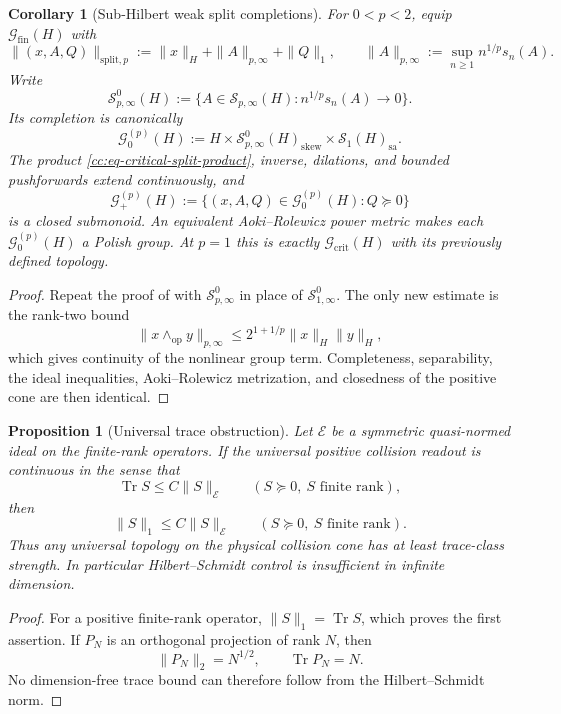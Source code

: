 \documentclass[10pt,reqno]{amsart}
\theoremstyle{plain}
\newtheorem{proposition}[theorem]{Proposition}
\newtheorem{corollary}[theorem]{Corollary}
\theoremstyle{definition}
\theoremstyle{remark}
\begin{document}
\begin{corollary}[Sub-Hilbert weak split completions]
\label{cc:cor-sub-Hilbert-split-completions}
For \(0<p<2\), equip \(\mathscr G_{\mathrm{fin}}(H)\) with
\[
 \|(x,A,Q)\|_{\mathrm{split},p}
 :=\|x\|_H+\|A\|_{p,\infty}+\|Q\|_1,
 \qquad
 \|A\|_{p,\infty}:=\sup_{n\geq1}n^{1/p}s_n(A).
\]
Write
\[
 \mathcal S^0_{p,\infty}(H)
 :=\{A\in\mathcal S_{p,\infty}(H):n^{1/p}s_n(A)\to0\}.
\]
Its completion is canonically
\begin{equation}
 \mathscr G^{(p)}_0(H)
 :=H\times\mathcal S^0_{p,\infty}(H)_{\mathrm{skew}}
       \times\mathcal S_1(H)_{\mathrm{sa}}.
 \label{cc:eq-sub-Hilbert-split-completion}
\end{equation}
The product \eqref{cc:eq-critical-split-product}, inverse, dilations, and
bounded pushforwards extend continuously, and
\[
 \mathscr G^{(p)}_+(H)
 :=\{(x,A,Q)\in\mathscr G^{(p)}_0(H):Q\succeq0\}
\]
is a closed submonoid.  An equivalent Aoki--Rolewicz power metric makes
each \(\mathscr G^{(p)}_0(H)\) a Polish group.  At \(p=1\) this is exactly
\(\mathscr G_{\mathrm{crit}}(H)\) with its previously defined topology.
\end{corollary}

\begin{proof}
Repeat the proof of  with
\(\mathcal S^0_{p,\infty}\) in place of
\(\mathcal S^0_{1,\infty}\).  The only new estimate is the rank-two bound
\[
 \|x\wedge_{\mathrm{op}}y\|_{p,\infty}
 \leq2^{1+1/p}\|x\|_H\|y\|_H,
\]
which gives continuity of the nonlinear group term.  Completeness,
separability, the ideal inequalities, Aoki--Rolewicz metrization, and
closedness of the positive cone are then identical.
\end{proof}

\begin{proposition}[Universal trace obstruction]
\label{cc:prop-critical-trace-obstruction}
Let \(\mathcal E\) be a symmetric quasi-normed ideal on the finite-rank
operators.  If the universal positive collision readout is continuous in
the sense that
\[
 \operatorname{Tr}S\leq C\|S\|_{\mathcal E}
 \qquad(S\succeq0,\ S\text{ finite rank}),
\]
then
\[
 \|S\|_1\leq C\|S\|_{\mathcal E}
 \qquad(S\succeq0,\ S\text{ finite rank}).
\]
Thus any universal topology on the physical collision cone has at least
trace-class strength.  In particular Hilbert--Schmidt control is
insufficient in infinite dimension.
\end{proposition}

\begin{proof}
For a positive finite-rank operator,
\(\|S\|_1=\operatorname{Tr}S\), which proves the first assertion.  If
\(P_N\) is an orthogonal projection of rank \(N\), then
\[
 \|P_N\|_2=N^{1/2},\qquad \operatorname{Tr}P_N=N.
\]
No dimension-free trace bound can therefore follow from the
Hilbert--Schmidt norm.
\end{proof}
\end{document}
